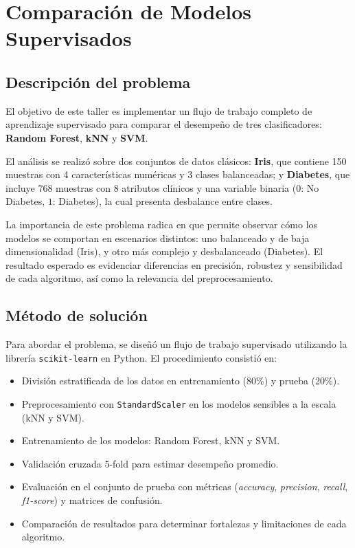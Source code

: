 \documentclass[a4paper,12pt]{article}
\begin{document}
\section{Comparación de Modelos Supervisados}

\subsection{Descripción del problema}
El objetivo de este taller es implementar un flujo de trabajo completo de aprendizaje supervisado para comparar el desempeño de tres clasificadores: \textbf{Random Forest}, \textbf{kNN} y \textbf{SVM}.  

El análisis se realizó sobre dos conjuntos de datos clásicos: \textbf{Iris}, que contiene 150 muestras con 4 características numéricas y 3 clases balanceadas; y \textbf{Diabetes}, que incluye 768 muestras con 8 atributos clínicos y una variable binaria ($0$: No Diabetes, $1$: Diabetes), la cual presenta desbalance entre clases.  

La importancia de este problema radica en que permite observar cómo los modelos se comportan en escenarios distintos: uno balanceado y de baja dimensionalidad (Iris), y otro más complejo y desbalanceado (Diabetes). El resultado esperado es evidenciar diferencias en precisión, robustez y sensibilidad de cada algoritmo, así como la relevancia del preprocesamiento.

\subsection{Método de solución}
Para abordar el problema, se diseñó un flujo de trabajo supervisado utilizando la librería \texttt{scikit-learn} en Python. El procedimiento consistió en:  

\begin{itemize}
    \item División estratificada de los datos en entrenamiento (80\%) y prueba (20\%).
    \item Preprocesamiento con \texttt{StandardScaler} en los modelos sensibles a la escala (kNN y SVM).
    \item Entrenamiento de los modelos: Random Forest, kNN y SVM.
    \item Validación cruzada 5-fold para estimar desempeño promedio.
    \item Evaluación en el conjunto de prueba con métricas (\textit{accuracy}, \textit{precision}, \textit{recall}, \textit{f1-score}) y matrices de confusión.
    \item Comparación de resultados para determinar fortalezas y limitaciones de cada algoritmo.
\end{itemize}
\end{document}

